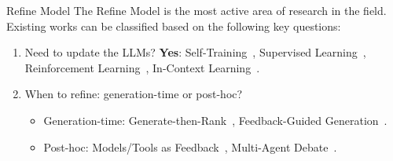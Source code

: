 \begin{frame}{Refine Model}
    The Refine Model is the most active area of research in the field. Existing works can be classified based on the following key questions:
    \begin{enumerate}
        \item Need to update the LLMs? \textbf{Yes}: Self-Training~\cite{huang2022large}, Supervised Learning~\cite{bai2022training}, Reinforcement Learning~\cite{dubois2024alpacafarm}, In-Context Learning~\cite{dong2022survey}.

        \item When to refine: generation-time or post-hoc?
              \begin{itemize}
                  \item Generation-time: Generate-then-Rank~\cite{cobbe2021training}, Feedback-Guided Generation~\cite{yao2023tree}.
                  \item Post-hoc: Models/Tools as Feedback~\cite{zhang2023selfedit}, Multi-Agent Debate~\cite{du2023improving}.
              \end{itemize}
    \end{enumerate}
\end{frame}
